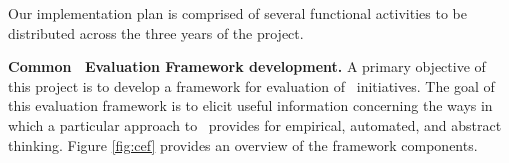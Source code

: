 


Our implementation plan is comprised of several functional activities to be
distributed across the three years of the project.

{\bf Common \eCT\ Evaluation Framework development.}  A primary objective
of this project is to develop a framework for evaluation of \eCT\
initiatives.  The goal of this evaluation framework is to elicit useful
information concerning the ways in which a particular approach to \eCT\
provides for empirical, automated, and abstract thinking. Figure
\ref{fig:cef} provides an overview of the framework components.


